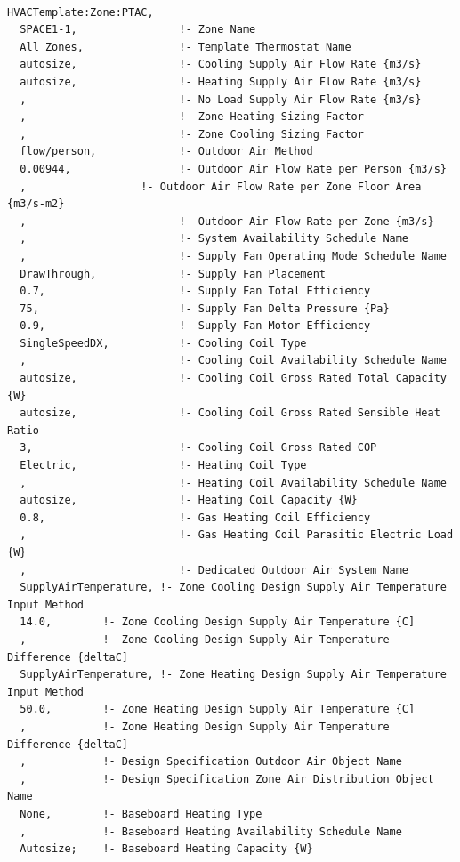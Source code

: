 \begin{lstlisting}

HVACTemplate:Zone:PTAC,
  SPACE1-1,                !- Zone Name
  All Zones,               !- Template Thermostat Name
  autosize,                !- Cooling Supply Air Flow Rate {m3/s}
  autosize,                !- Heating Supply Air Flow Rate {m3/s}
  ,                        !- No Load Supply Air Flow Rate {m3/s}
  ,                        !- Zone Heating Sizing Factor
  ,                        !- Zone Cooling Sizing Factor
  flow/person,             !- Outdoor Air Method
  0.00944,                 !- Outdoor Air Flow Rate per Person {m3/s}
  ,                  !- Outdoor Air Flow Rate per Zone Floor Area {m3/s-m2}
  ,                        !- Outdoor Air Flow Rate per Zone {m3/s}
  ,                        !- System Availability Schedule Name
  ,                        !- Supply Fan Operating Mode Schedule Name
  DrawThrough,             !- Supply Fan Placement
  0.7,                     !- Supply Fan Total Efficiency
  75,                      !- Supply Fan Delta Pressure {Pa}
  0.9,                     !- Supply Fan Motor Efficiency
  SingleSpeedDX,           !- Cooling Coil Type
  ,                        !- Cooling Coil Availability Schedule Name
  autosize,                !- Cooling Coil Gross Rated Total Capacity {W}
  autosize,                !- Cooling Coil Gross Rated Sensible Heat Ratio
  3,                       !- Cooling Coil Gross Rated COP
  Electric,                !- Heating Coil Type
  ,                        !- Heating Coil Availability Schedule Name
  autosize,                !- Heating Coil Capacity {W}
  0.8,                     !- Gas Heating Coil Efficiency
  ,                        !- Gas Heating Coil Parasitic Electric Load {W}
  ,                        !- Dedicated Outdoor Air System Name
  SupplyAirTemperature, !- Zone Cooling Design Supply Air Temperature Input Method
  14.0,        !- Zone Cooling Design Supply Air Temperature {C]
  ,            !- Zone Cooling Design Supply Air Temperature Difference {deltaC]
  SupplyAirTemperature, !- Zone Heating Design Supply Air Temperature Input Method
  50.0,        !- Zone Heating Design Supply Air Temperature {C]
  ,            !- Zone Heating Design Supply Air Temperature Difference {deltaC]
  ,            !- Design Specification Outdoor Air Object Name
  ,            !- Design Specification Zone Air Distribution Object Name
  None,        !- Baseboard Heating Type
  ,            !- Baseboard Heating Availability Schedule Name
  Autosize;    !- Baseboard Heating Capacity {W}
\end{lstlisting}


